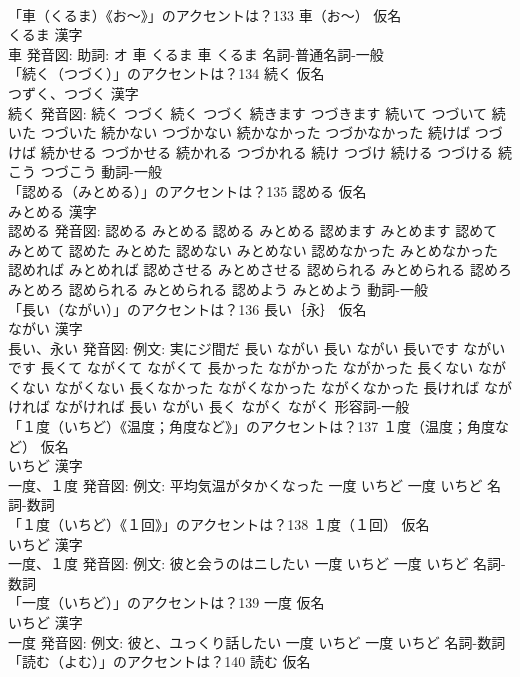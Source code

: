 \documentclass[8pt]{extreport}
\begin{document}
\begin{CJK}{UTF8}{min}
\\	「車（くるま）《お〜》」のアクセントは？133	車（お〜） 仮名　
\\	くるま 漢字　
\\	車 発音図: 助詞: オ	車 くるま		車 くるま				名詞-普通名詞-一般 
\\	「続く（つづく）」のアクセントは？134	続く 仮名　
\\	つずく、つづく 漢字　
\\	続く 発音図:	続く つづく		続く つづく 続きます つづきます 続いて つづいて 続いた つづいた 続かない つづかない 続かなかった つづかなかった 続けば つづけば 続かせる つづかせる 続かれる つづかれる 続け つづけ 続ける つづける 続こう つづこう				動詞-一般 
\\	「認める（みとめる）」のアクセントは？135	認める 仮名　
\\	みとめる 漢字　
\\	認める 発音図:	認める みとめる		認める みとめる 認めます みとめます 認めて みとめて 認めた みとめた 認めない みとめない 認めなかった みとめなかった 認めれば みとめれば 認めさせる みとめさせる 認められる みとめられる 認めろ みとめろ 認められる みとめられる 認めよう みとめよう				動詞-一般 
\\	「長い（ながい）」のアクセントは？136	長い｛永｝ 仮名　
\\	ながい 漢字　
\\	長い、永い 発音図: 例文: 実にジ間だ	長い ながい		長い ながい 長いです ながいです 長くて ながくて ながくて 長かった ながかった ながかった 長くない ながくない ながくない 長くなかった ながくなかった ながくなかった 長ければ ながければ ながければ 長い ながい 長く ながく ながく				形容詞-一般 
\\	「１度（いちど）《温度；角度など》」のアクセントは？137	１度（温度；角度など） 仮名　
\\	いちど 漢字　
\\	一度、１度 発音図: 例文: 平均気温がタかくなった	一度 いちど		一度 いちど				名詞-数詞 
\\	「１度（いちど）《１回》」のアクセントは？138	１度（１回） 仮名　
\\	いちど 漢字　
\\	一度、１度 発音図: 例文: 彼と会うのはニしたい	一度 いちど		一度 いちど				名詞-数詞 
\\	「一度（いちど）」のアクセントは？139	一度 仮名　
\\	いちど 漢字　
\\	一度 発音図: 例文: 彼と、ユっくり話したい	一度 いちど		一度 いちど				名詞-数詞 
\\	「読む（よむ）」のアクセントは？140	読む 仮名　

\end{CJK}
\end{document}
